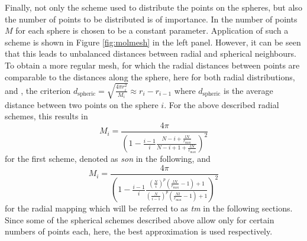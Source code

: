 %
Finally, not only the scheme used to distribute the points on the spheres, but also the number of points to be distributed is of importance.
In \cite{Son_Chu0} the number of points $M$ for each sphere is chosen to be a constant parameter.
Application of such a scheme is shown in Figure \ref{fig:molmesh} in the left panel.
However, it can be seen that this leads to unbalanced distances between radial and spherical neighbours.
To obtain a more regular mesh, for which the radial distances between points are comparable to the distances along the sphere, here for both radial distributions,  and , the criterion $d_\text{spheric}=\sqrt{\frac{4\pi r_i^2}{M_i}}\approx r_i-r_{i-1}$ where $d_\text{spheric}$ is the average distance between two points on the sphere $i$.
For the above described radial schemes, this results in 
\begin{equation}\label{eq:tm_num}
M_i= \frac{4\pi}{ \left(1-\frac{i-1 }{i}\frac{N-i+\frac{lN}{r_\text{max}}}{N-i+1+\frac{lN}{r_\text{max}}}\right)^2 }
\end{equation}
for the first scheme, denoted as \textit{son} in the following, and 
\begin{equation} \label{eq:son_num}
M_i= \frac{4\pi}{\left(1-\frac{i-1 }{i}\frac{ (\frac{N}{i})^p \left(\frac{lN}{r_\text{max}}-1\right)+1}{ (\frac{N}{i-1})^p\left( \frac{Nl}{r_\text{max}} -1 \right) +1 } \right)^2 }
\end{equation}
for the radial mapping  which will be referred to as \textit{tm} in the following sections.
Since some of the spherical schemes described above allow only for certain numbers of points each, here, the best approximation is used respectively.

